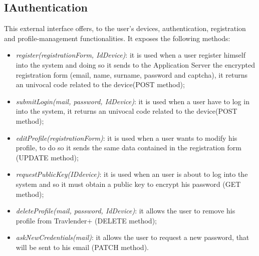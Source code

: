 \subsection{IAuthentication}
\label{subsect:IAuthentication}
This external interface offers, to the user's devices, authentication, registration and profile-management functionalities. It exposes the following methods:
\begin{itemize}
	\item \textit{register(registrationForm, IdDevice)}: it is used when a user register himself into the system and doing so it sends to the Application Server the encrypted registration form (email, name, surname, password and captcha), it returns an univocal code related to the device(POST method);
	\item \textit{submitLogin(mail, password, IdDevice)}: it is used when a user have to log in into the system, it returns an univocal code related to the device(POST method);
	\item \textit{editProfile(registrationForm)}: it is used when a user wants to modify his profile, to do so it sends the same data contained in the registration form (UPDATE method);
	\item \textit{requestPublicKey(IDdevice)}: it is used when an user is about to log into the system and so it must obtain a public key to encrypt his password (GET method);
	\item \textit{deleteProfile(mail, password, IdDevice)}: it allows the user to remove his profile from Travlender+ (DELETE method);
	\item \textit{askNewCredentials(mail)}: it allows the user to request a new password, that will be sent to his email (PATCH method).
\end{itemize}

